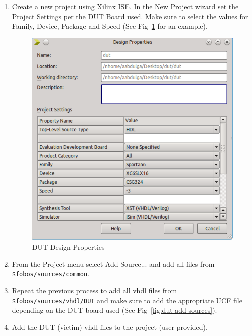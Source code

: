 \begin{enumerate}
  \item Create a new project using Xilinx ISE. In the New Project wizard set the Project Settings per the DUT Board used. 
  Make sure to select the values for Family, Device, Package and Speed (See Fig~\ref{fig:dut-design-properties} for an example).
		\begin{figure} 
		\begin{center}
		\includegraphics[scale=0.6]{figures/dut-design-properties}
		\caption{\label{fig:dut-design-properties}DUT Design Properties}
		\end{center}
		\vspace{-1ex}
		\end{figure}
  \item From the Project menu select Add Source... and add all files from \texttt{\$fobos/sources/common}.
  \item Repeat the previous process to add all vhdl files from \texttt{\$fobos/sources/vhdl/DUT} and make sure to add the appropriate UCF file depending on the DUT board used (See Fig~\ref{fig:dut-add-sources}).
  	\item Add the DUT (victim) vhdl files to the project (user provided).
		\begin{figure} 
		\begin{center}

\end{center}
\end{figure}
\end{enumerate}
